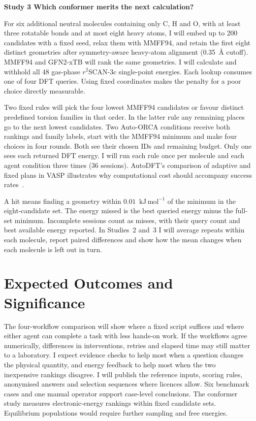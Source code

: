 \documentclass[12pt,a4paper]{article}
\newcommand{\subhead}[1]{\par\addvspace{0.4em}\textbf{#1}\par\nobreak}
\newcommand{\unitE}{\ensuremath{\mathrm{kJ\,mol^{-1}}}}
\begin{document}
\subhead{Study 3 \enspace Which conformer merits the next calculation?}
For six additional neutral molecules containing only C, H and O, with at
least three rotatable bonds and at most eight heavy atoms, I will embed up
to 200 candidates with a fixed seed, relax them with
MMFF94, and retain the first eight distinct geometries after symmetry-aware
heavy-atom alignment (0.35~\AA{} cutoff). MMFF94 and GFN2-xTB will rank the
same geometries. I will calculate and withhold all 48 gas-phase
$r^2$SCAN-3c single-point energies. Each lookup consumes one of four DFT
queries. Using fixed coordinates makes the penalty for a poor choice directly
measurable.

Two fixed rules will pick the four lowest MMFF94 candidates or favour distinct
predefined torsion families in that order. In the latter rule any remaining
places go to the next lowest candidates. Two Auto-ORCA conditions receive both
rankings and family labels, start with the MMFF94 minimum and make four choices
in four rounds. Both see their chosen IDs and remaining budget. Only one sees
each returned DFT energy. I will run each rule once per molecule and each agent
condition three times (36 sessions). AutoDFT's comparison of adaptive and
fixed plans in VASP illustrates why computational cost should accompany
success rates~\cite{autodft}.

A hit means finding a geometry within $0.01$~\unitE{} of the minimum in the
eight-candidate set. The energy missed is the best queried energy minus the
full-set minimum. Incomplete sessions count as misses, with their query count
and best available energy reported. In Studies~2 and~3 I will average repeats
within each molecule, report paired differences and show how the mean changes
when each molecule is left out in turn.

\clearpage
\section{Expected Outcomes and Significance}
The four-workflow comparison will show where a fixed script suffices and where
either agent can complete a task with less hands-on work. If the workflows
agree numerically, differences in interventions, retries and elapsed time may
still matter to a laboratory. I expect evidence checks to help most when a
question changes the physical quantity, and energy feedback to help most when
the two inexpensive rankings disagree. I will publish the reference inputs,
scoring rules, anonymised answers and selection sequences where licences allow.
Six benchmark cases and one manual operator support case-level conclusions.
The conformer study measures electronic-energy rankings within fixed candidate
sets. Equilibrium populations would require further sampling and free energies.
\end{document}
